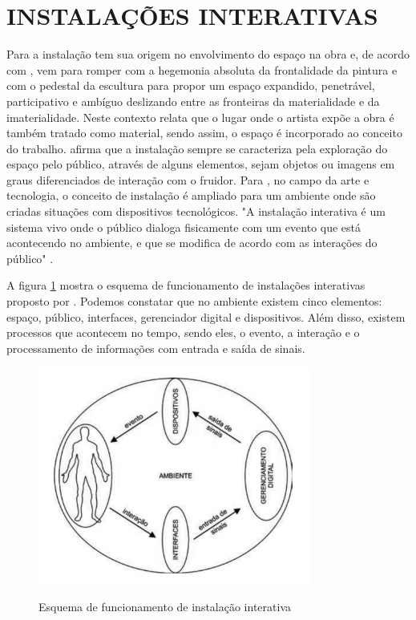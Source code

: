\section{INSTALAÇÕES INTERATIVAS}

Para  a instalação tem sua origem no envolvimento do espaço na obra e, de acordo com , vem para romper com a hegemonia absoluta da frontalidade da pintura e com o pedestal da escultura para propor um espaço expandido, penetrável, participativo e ambíguo deslizando entre as fronteiras da materialidade e da imaterialidade. Neste contexto  relata que o lugar onde o artista expõe a obra é também tratado como material, sendo assim, o espaço é incorporado ao conceito do trabalho.  afirma que a instalação sempre se caracteriza pela exploração do espaço pelo público, através de alguns elementos, sejam objetos ou imagens em graus diferenciados de interação com o fruidor. Para , no campo da arte e tecnologia, o conceito de instalação é ampliado para um ambiente onde são criadas situações com dispositivos tecnológicos. "A instalação interativa é um sistema vivo onde o público dialoga fisicamente com um evento que está acontecendo no ambiente, e que se modifica de acordo com as interações do público" \cite[p. 62]{sogabe2011}.


A figura \ref{fig:instalacoes_interativas} mostra o esquema de funcionamento de instalações interativas proposto por . Podemos constatar que no ambiente existem cinco elementos: espaço, público, interfaces, gerenciador digital e dispositivos. Além disso, existem processos que acontecem no tempo, sendo eles, o evento, a interação e o processamento de informações com entrada e saída de sinais. 

\begin{figure}[H]
    \centering
    \caption{Esquema de funcionamento de instalação interativa}
	\vspace*{0,2cm}
    \includegraphics[width=0.8\textwidth]{./04-figuras/instalacoes_interativas}
    \label{fig:instalacoes_interativas}
\end{figure}
\vspace*{-0,9cm}
{\raggedright {}}\\


